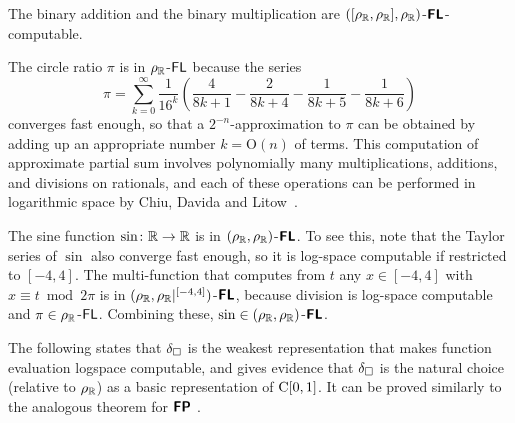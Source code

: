 \documentclass[a4paper,UKenglish]{lipics}
\begin{document}
\begin{example}
 The binary addition and the binary multiplication are
 $([\rho _\mathbb R, \rho _\mathbb R], \rho _\mathbb R)$-$\text{\bfseries \sffamily \upshape FL}$-computable.
\end{example}

\begin{example}
\label{example: pi}
The circle ratio $\pi$ is in $\rho _\mathbb R$-$\mathsf{FL}$ because the series
\begin{equation}
 \pi = \sum_{k=0}^\infty \frac{1}{16^k} 
  \left( \frac{4}{8k+1} - \frac{2}{8k+4} - \frac{1}{8k+5} - \frac{1}{8k+6} \right)
\end{equation}
converges fast enough, 
so that a $2 ^{-n}$-approximation to $\pi$ can be obtained by adding up 
an appropriate number $k = \mathrm O (n)$ of terms. 
This computation of approximate partial sum involves 
polynomially many multiplications, additions, and divisions on rationals, 
and each of these operations can be performed in logarithmic space
by Chiu, Davida and Litow~\cite{chiu2001division}.
\end{example}



\begin{example}
\label{example: sine}
The sine function $\sin \colon \mathbb R \to \mathbb R$ is
in $(\rho _\mathbb R, \rho _\mathbb R)$-$\text{\bfseries \sffamily \upshape FL}$.
To see this, note that 
the Taylor series of $\sin$ also converge fast enough,
so it is log-space computable if restricted to $[-4, 4]$.
The multi-function that computes from $t$
any $x \in [-4, 4]$ with $x \equiv t \bmod 2 \pi$ is
in $(\rho _\mathbb R, \rho _\mathbb R|^{[-4,4]})$-$\text{\bfseries \sffamily \upshape FL}$, 
because division is log-space computable 
and $\pi \in \rho _\mathbb R$-$\mathsf{FL}$. 
Combining these, $\sin \in (\rho _\mathbb R, \rho _\mathbb R)$-$\text{\bfseries \sffamily \upshape FL}$.
\end{example}

The following states that $\delta _\square$ 
is the weakest representation that makes function evaluation 
logspace computable, 
and gives evidence that 
$\delta _\square$ is the natural choice (relative to $\rho _\mathbb R$)
as a basic representation of $\mathrm C [0, 1]$. 
It can be proved similarly to the analogous theorem for $\text{\bfseries \sffamily \upshape FP}$ 
\cite{kawamura11:_funct_space_repres_and_polyn_time_comput}. 
\end{document}
